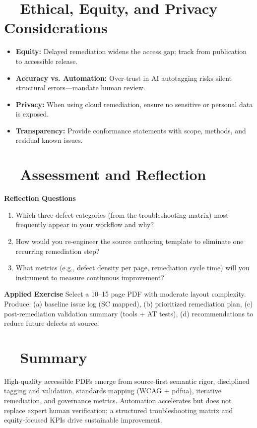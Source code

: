\section{~~Ethical, Equity, and Privacy Considerations}\label{ch17:sec:ethics-equity}
\begin{itemize}
	\item \textbf{Equity:} Delayed remediation widens the access gap; track  from publication to accessible release.
	\item \textbf{Accuracy vs. Automation:} Over-trust in AI autotagging risks silent structural errors—mandate human review.
	\item \textbf{Privacy:} When using cloud remediation, ensure no sensitive or personal data is exposed.
	\item \textbf{Transparency:} Provide conformance statements with scope, methods, and residual known issues.
\end{itemize}

\section{~~Assessment and Reflection}\label{ch17:sec:assessment-reflection}
\textbf{Reflection Questions}
\begin{enumerate}
	\item Which three defect categories (from the troubleshooting matrix) most frequently appear in your workflow and why?
	\item How would you re-engineer the source authoring template to eliminate one recurring remediation step?
	\item What metrics (e.g., defect density per page, remediation cycle time) will you instrument to measure continuous improvement?
\end{enumerate}
\textbf{Applied Exercise} Select a 10–15 page PDF with moderate layout complexity. Produce: (a) baseline issue log (SC mapped), (b) prioritized remediation plan, (c) post-remediation validation summary (tools + AT tests), (d) recommendations to reduce future defects at source.

\section{~~Summary}\label{ch17:sec:summary}
High-quality accessible PDFs emerge from source-first semantic rigor, disciplined tagging and  validation, standards mapping (WCAG + \gls{pdfua}), iterative remediation, and governance metrics. Automation accelerates but does not replace expert human verification; a structured troubleshooting matrix and equity-focused KPIs drive sustainable improvement.


